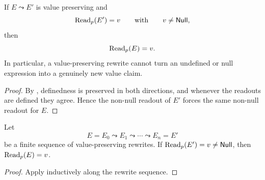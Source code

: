 \begin{proposition}\label{prop:value-preserving-no-creation}
If $E\leadsto E'$ is value preserving and
\[
\mathrm{Read}_p(E')=v
\qquad\text{with}\qquad
v\neq \mathsf{Null},
\]
then
\[
\mathrm{Read}_p(E)=v.
\]
In particular, a value-preserving rewrite cannot turn an undefined or null expression into a genuinely new value claim.
\end{proposition}

\begin{proof}
By , definedness is preserved in both directions, and whenever the readouts are defined they agree. Hence the non-null readout of $E'$ forces the same non-null readout for $E$.
\end{proof}

\begin{corollary}\label{cor:normalization-no-fact-creation}
Let
\[
E=E_0\leadsto E_1\leadsto\cdots\leadsto E_n=E'
\]
be a finite sequence of value-preserving rewrites. If $\mathrm{Read}_p(E')=v\neq \mathsf{Null}$, then $\mathrm{Read}_p(E)=v$.
\end{corollary}

\begin{proof}
Apply  inductively along the rewrite sequence.
\end{proof}

